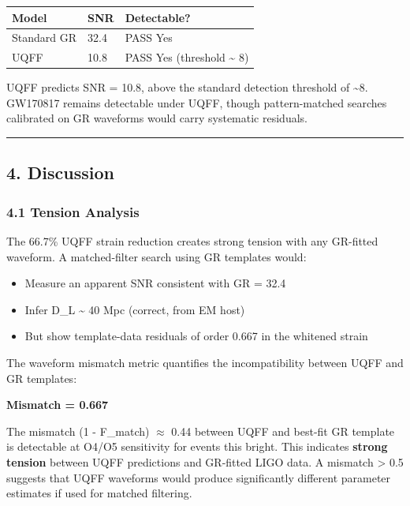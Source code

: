 \documentclass[
  11pt,
]{article}
\newcounter{none} %
\providecommand{\tightlist}{%
  \setlength{\itemsep}{0pt}\setlength{\parskip}{0pt}}
\begin{document}
{\def\LTcaptype{none} %
\begin{longtable}[]{@{}lll@{}}
\toprule\noalign{}
Model & SNR & Detectable? \\
\midrule\noalign{}
\endhead
\bottomrule\noalign{}
\endlastfoot
Standard GR & 32.4 & PASS Yes \\
UQFF & 10.8 & PASS Yes (threshold \textasciitilde{} 8) \\
\end{longtable}
}

UQFF predicts SNR = 10.8, above the standard detection threshold of
\textasciitilde8. GW170817 remains detectable under UQFF, though
pattern-matched searches calibrated on GR waveforms would carry
systematic residuals.

\begin{center}\rule{0.5\linewidth}{0.5pt}\end{center}

\subsection{4. Discussion}\label{discussion}

\subsubsection{4.1 Tension Analysis}\label{tension-analysis}

The 66.7\% UQFF strain reduction creates strong tension with any
GR-fitted waveform. A matched-filter search using GR templates would:

\begin{itemize}
\tightlist
\item
  Measure an apparent SNR consistent with GR = 32.4
\item
  Infer D\_L \textasciitilde{} 40 Mpc (correct, from EM host)
\item
  But show template-data residuals of order 0.667 in the whitened strain
\end{itemize}

The waveform mismatch metric quantifies the incompatibility between UQFF
and GR templates:

\textbf{Mismatch = 0.667}

The mismatch (1 - F\_match) $\approx$ 0.44 between UQFF and best-fit
GR template is detectable at O4/O5 sensitivity for events this bright.
This indicates \textbf{strong tension} between UQFF predictions and
GR-fitted LIGO data. A mismatch \textgreater{} 0.5 suggests that UQFF
waveforms would produce significantly different parameter estimates if
used for matched filtering.
\end{document}
